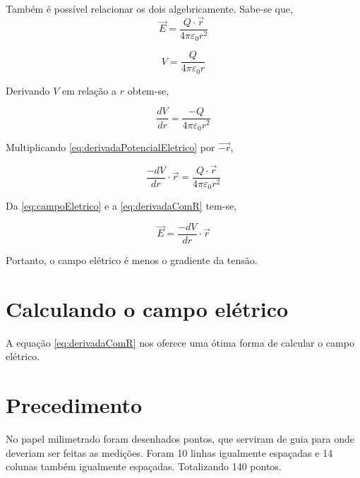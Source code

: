 \documentclass[
12pt,				%
oneside,			%
a4paper,			%
english,			%
french,				%
spanish,			%
brazil				%
]{abntex2}
\begin{document}
Também é possível relacionar os dois algebricamente.
Sabe-se que,
\begin{equation}
    \label{eq:campoEletrico}
    \vec{E} = \frac{Q \cdot \vec{r}}{4\pi\varepsilon_{0}r^{2}}
\end{equation}

\begin{equation}
    \label{eq:potencialEletrico}
    V = \frac{Q}{4\pi\varepsilon_{0}r}
\end{equation}

Derivando $V$ em relação a $r$ obtem-se,

\begin{equation}
    \label{eq:derivadaPotencialEletrico}
    \frac{dV}{dr} = \frac{-Q}{4\pi\varepsilon_{0}r^{2}}
\end{equation}

Multiplicando \autoref{eq:derivadaPotencialEletrico} por $\vec{-r}$,

\begin{equation}
    \label{eq:derivadaComR}
    \frac{-dV}{dr}\cdot\vec{r} = \frac{Q \cdot \vec{r}}{4\pi\varepsilon_{0}r^{2}}
\end{equation}

Da \autoref{eq:campoEletrico} e a \autoref{eq:derivadaComR} tem-se,

\begin{equation}
    \label{eq:campoEletrico}
    \vec{E} = \frac{-dV}{dr}\cdot\vec{r}
\end{equation}

Portanto, o campo elétrico é menos o gradiente da tensão.

\chapter{Calculando o campo elétrico}

A equação \autoref{eq:derivadaComR} nos oferece uma ótima forma de calcular o campo elétrico.

\chapter{Precedimento}

No papel milimetrado foram desenhados pontos, que serviram de guia para onde deveriam ser feitas as medições. Foram 10 linhas igualmente espaçadas e 14 colunas também igualmente espaçadas. Totalizando 140 pontos.
\end{document}
